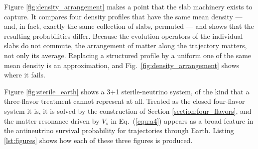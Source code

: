 \documentclass[final,5p,times,twocolumn]{elsarticle}
\newcommand{\eq}{Eq.}
\newcommand{\fig}{Fig.}
\newcommand{\equ}[1]{\eq~(\ref{equ:#1})}
\newcommand{\figu}[1]{\fig~\ref{fig:#1}}
\providecommand{\DIFaddtex}[1]{{\protect\color{blue} \sf #1}} %
\providecommand{\DIFadd}[1]{\DIFaddtex{#1}} %
\begin{document}
\DIFadd{Figure \ref{fig:density_arrangement} makes a point that the slab machinery exists to capture.  It compares four density profiles that have the same mean density --- and, in fact, exactly the same collection of slabs, permuted --- and shows that the resulting probabilities differ.  Because the evolution operators of the individual slabs do not commute, the arrangement of matter along the trajectory matters, not only its average.  Replacing a structured profile by a uniform one of the same mean density is an approximation, and \figu{density_arrangement} shows where it fails.
}

\DIFadd{Figure \ref{fig:sterile_earth} shows a 3+1 sterile-neutrino system, of the kind that a three-flavor treatment cannot represent at all.  Treated as the closed four-flavor system it is, it is solved by the construction of Section \ref{section:four_flavors}, and the matter resonance driven by $V_s$ in \equ{a4} appears as a broad feature in the antineutrino survival probability for trajectories through Earth.  Listing \ref{lst:figures} shows how each of these three figures is produced.
}
\end{document}
